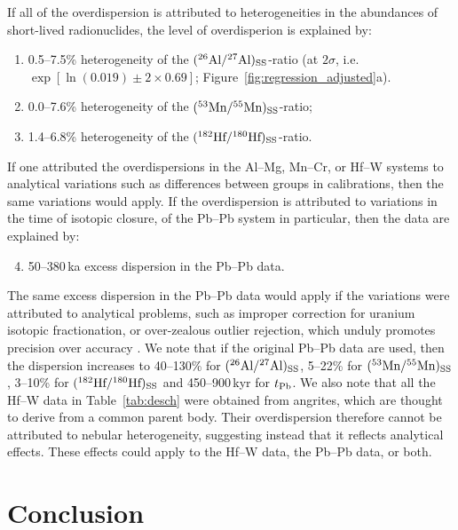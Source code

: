 If all of the overdispersion is attributed to heterogeneities in the
abundances of short-lived radionuclides, the level of overdisperion is
explained by:
\begin{enumerate}
\item 0.5--7.5\% heterogeneity of the
  $({}^{26}\mbox{Al}/{}^{27}\mbox{Al})_{\rm SS}$-ratio (at $2\sigma$,
  i.e. $\exp[\ln(0.019)\pm{2\times0.69}]$;
  Figure~\ref{fig:regression_adjusted}a).
\item 0.0--7.6\% heterogeneity of the 
  $({}^{53}\mbox{Mn}/{}^{55}\mbox{Mn})_{\rm SS}$-ratio;
\item 1.4--6.8\% heterogeneity of the
  $({}^{182}\mbox{Hf}/{}^{180}\mbox{Hf})_{\rm SS}$-ratio.
\end{enumerate}
If one attributed the overdispersions in the Al--Mg, Mn--Cr, or Hf--W
systems to analytical variations such as differences between groups in
calibrations, then the same variations would apply. If the
overdispersion is attributed to variations in the time of isotopic
closure, of the Pb--Pb system in particular, then the data are
explained by:
\begin{enumerate}
  \setcounter{enumi}{3}
\item 50--380\,ka excess dispersion in the Pb--Pb data.
\end{enumerate}
The same excess dispersion in the Pb--Pb data would apply if the
variations were attributed to analytical problems, such as improper
correction for uranium isotopic fractionation, or over-zealous outlier
rejection, which unduly promotes precision over accuracy
\citep{vermeesch2026f}.  We note that if the original Pb--Pb data are
used, then the dispersion increases to 40--130\% for
$({}^{26}\mbox{Al}/{}^{27}\mbox{Al})_{\rm SS}$, 5--22\% for
$({}^{53}\mbox{Mn}/{}^{55}\mbox{Mn})_{\rm SS}$, 3--10\% for
$({}^{182}\mbox{Hf}/{}^{180}\mbox{Hf})_{\rm SS}$ and 450--900\,kyr for
$t_{\rm Pb}$. We also note that all the Hf--W data in
Table~\ref{tab:desch} were obtained from angrites, which are thought
to derive from a common parent body. Their overdispersion therefore
cannot be attributed to nebular heterogeneity, suggesting instead that
it reflects analytical effects. These effects could apply to the Hf--W
data, the Pb--Pb data, or both.

\section{Conclusion}
\label{sec:conclusion}


